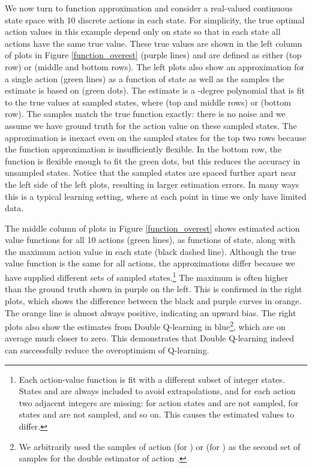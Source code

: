 \documentclass[letterpaper]{article}
\begin{document}
We now turn to function approximation and consider a real-valued continuous state space with 10 discrete actions in each state. For simplicity, the true optimal action values in this example depend only on state so that in each state all actions have the same true value. These true values are shown in the left column of plots in Figure \ref{function_overest} (purple lines) and are defined as either  (top row) or  (middle and bottom rows). The left plots also show an approximation for a single action (green lines) as a function of state as well as the samples the estimate is based on (green dots).  The estimate is a -degree polynomial that is fit to the true values at sampled states, where  (top and middle rows) or  (bottom row). The samples match the true function exactly: there is no noise and we assume we have ground truth for the action value on these sampled states.  The approximation is inexact even on the sampled states for the top two rows because the function approximation is insufficiently flexible. In the bottom row, the function is flexible enough to fit the green dots, but this reduces the accuracy in unsampled states.   Notice that the sampled states are spaced further apart near the left side of the left plots, resulting in larger estimation errors.  In many ways this is a typical learning setting, where at each point in time we only have limited data.

The middle column of plots in Figure \ref{function_overest} shows estimated action value functions for all 10 actions (green lines), as functions of state, along with the maximum action value in each state (black dashed line).  Although the true value function is the same for all actions, the approximations differ because we have supplied different sets of sampled states.\footnote{Each action-value function is fit with a different subset of integer states. States  and  are always included to avoid extrapolations, and for each action two adjacent integers are missing: for action  states  and  are not sampled, for  states  and  are not sampled, and so on. This causes the estimated values to differ.} The maximum is often higher than the ground truth shown in purple on the left.  This is confirmed in the right plots, which shows the difference between the black and purple curves in orange.  The orange line is almost always positive, indicating an upward bias. The right plots also show the estimates from Double Q-learning in blue\footnote{We arbitrarily used the samples of action  (for ) or  (for ) as the second set of samples for the double estimator of action .}, which are on average much closer to zero.  This demonstrates that Double Q-learning indeed can successfully reduce the overoptimism of Q-learning.
\end{document}
